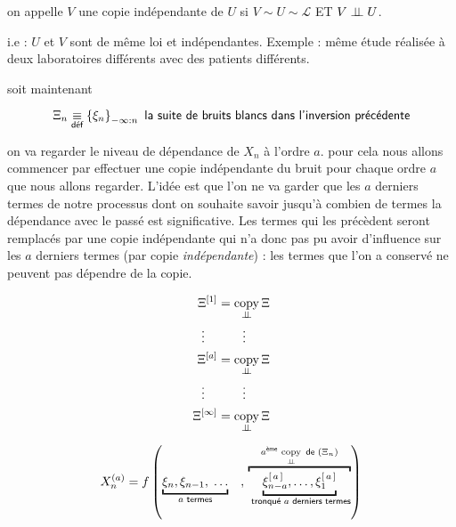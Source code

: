 \begin{definition}
	on appelle $V$ une copie indépendante de $U$ si $V \sim U \sim \mathcal L$ ET $V \perp \!\!\! \perp U$.

	i.e : $U$ et $V$ sont de même loi et indépendantes. Exemple : même étude réalisée à deux laboratoires différents avec des patients différents.
\end{definition}

soit maintenant

$$\Xi_n \underset {\textsf{déf}} {\equiv} \left\{ \xi_n\right\}_{-\infty : n} \textsf{ la suite de bruits blancs dans l'inversion précédente}$$

on va regarder le niveau de dépendance de $X_n$ à l'ordre $a$. pour cela nous allons commencer par effectuer une copie indépendante du bruit pour chaque ordre $a$ que nous allons regarder. L'idée est que l'on ne va garder que les $a$ derniers termes de notre processus dont on souhaite savoir jusqu'à combien de termes la dépendance avec le passé est significative. Les termes qui les précèdent seront remplacés par une copie indépendante qui n'a donc pas pu avoir d'influence sur les $a$ derniers termes (par copie \emph{indépendante}) : les termes que l'on a conservé ne peuvent pas dépendre de la copie.


\begin{minipage}{0.45\textwidth}

	\begin{align*}
		\Xi^{[1]}      & = \operatornamewithlimits{copy}\limits_{\indep} \Xi
		\\
		\vdots\quad    & \quad\quad \vdots
		\\
		\Xi^{[a]}      & = \operatornamewithlimits{copy}\limits_{\indep} \Xi
		\\ \vdots\quad &  \quad\quad \vdots
		\\
		\Xi^{[\infty]} & = \operatornamewithlimits{copy}\limits_{\indep} \Xi
	\end{align*}

\end{minipage}
%
\begin{minipage}{0.45\textwidth}
	$$X_n^{(a)} = f\left(
		\underbracket{
			\xi_n, \xi_{n-1}, \; \dots}_
		{a \textsf{ termes}}
		\quad , \,
		\overbracket
		{\underbracket{\xi_{n-a}^{[\, a \, ]} , \dots , \xi_{1}^{[ \, a \, ]}}_
			{\textsf{ tronqué } a \textsf{ derniers termes}}
		}^{a^{\textsf{ème}} \, \operatornamewithlimits{copy}\limits_{\indep} \textsf{ de } (\Xi_n)}
		\right)$$
\end{minipage}

